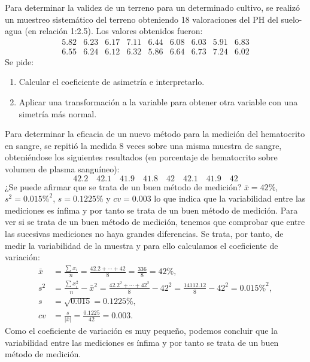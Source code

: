 {Para determinar la validez de un terreno para un determinado cultivo, se realizó un muestreo sistemático del terreno obteniendo 18 valoraciones del PH del suelo-agua (en relación 1:2.5).
Los valores obtenidos fueron:
\[
\begin{array}{ccccccccc}
5.82 & 6.23 & 6.17 & 7.11 & 6.44 & 6.08 & 6.03 & 5.91 & 6.83 \\
6.55 & 6.24 & 6.12 & 6.32 & 5.86 & 6.64 & 6.73 & 7.24 & 6.02
\end{array}
\]
Se pide:
\begin{enumerate}
\item Calcular el coeficiente de asimetría e interpretarlo.
\item Aplicar una transformación a la variable para obtener otra variable con una simetría más normal.
\end{enumerate}
}


{Para determinar la eficacia de un nuevo método para la medición del hematocrito en sangre, se repitió la medida 8 veces sobre una misma muestra de sangre, obteniéndose los siguientes resultados (en porcentaje de hematocrito sobre volumen de plasma sanguíneo):
\[
42.2\quad 42.1\quad 41.9\quad 41.8\quad 42\quad 42.1\quad 41.9\quad 42
\]
¿Se puede afirmar que se trata de un buen método de medición?
}
{$\bar x= 42\%$, $s^2=0.015\%^2$, $s=0.1225\%$ y $cv=0.003$ lo que indica que la variabilidad entre las mediciones es ínfima y por tanto se trata de un buen método de medición.
}
{Para ver si se trata de un buen método de medición, tenemos que comprobar que entre las sucesivas mediciones no haya grandes diferencias. Se trata, por tanto, de medir la variabilidad de la muestra y para ello calculamos el coeficiente de variación:
\begin{align*}
\bar x & = \frac{\sum x_i}{n} = \frac{42.2+\cdots+42}{8} = \frac{336}{8}= 42\%,\\
s^2 & = \frac{\sum x_i^2}{n}-\bar x^2 = \frac{42.2^2+\cdots+42^2}{8}-42^2 = \frac{14112.12}{8}-42^2= 0.015\%^2,\\
s &= \sqrt{0.015} = 0.1225\%,\\
cv &= \frac{s}{|\bar x|} = \frac{0.1225}{42} = 0.003.
\end{align*}
Como el coeficiente de variación es muy pequeño, podemos concluir que la variabilidad entre las mediciones es ínfima y por tanto se trata de un buen método de medición.
}


